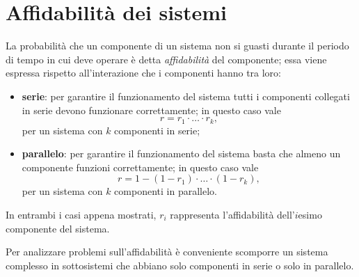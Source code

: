     \section{Affidabilità dei sistemi}
        \begin{defn}
            La probabilità che un componente di un sistema non si guasti durante il periodo di tempo in cui deve operare è detta \emph{affidabilità} del componente; essa viene espressa rispetto all'interazione che i componenti hanno tra loro:
            \begin{itemize}
                \item \textbf{serie}: per garantire il funzionamento del sistema tutti i componenti collegati in serie devono funzionare correttamente; in questo caso vale \[
                    r = r_1 \cdot \ldots \cdot r_k
                ,\] per un sistema con $k$ componenti in serie;
            \item \textbf{parallelo}: per garantire il funzionamento del sistema basta che almeno un componente funzioni correttamente; in questo caso vale \[
                        r = 1 - (1 - r_1) \cdot \ldots \cdot (1 - r_k)
                ,\] per un sistema con $k$ componenti in parallelo.
            \end{itemize}
            In entrambi i casi appena mostrati, $r_i$ rappresenta l'affidabilità dell'$i$\nbdash esimo componente del sistema.
        \end{defn}
        \begin{obsv}
            Per analizzare problemi sull'affidabilità è conveniente scomporre un sistema complesso in sottosistemi che abbiano solo componenti in serie o solo in parallelo.
        \end{obsv}
